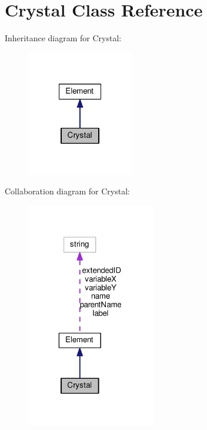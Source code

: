 \hypertarget{classCrystal}{\section{Crystal Class Reference}
\label{classCrystal}
}


Inheritance diagram for Crystal\+:
\nopagebreak
\begin{figure}[H]
\begin{center}
\leavevmode
\includegraphics[width=132pt]{classCrystal__inherit__graph}
\end{center}
\end{figure}


Collaboration diagram for Crystal\+:
\nopagebreak
\begin{figure}[H]
\begin{center}
\leavevmode
\includegraphics[width=160pt]{classCrystal__coll__graph}
\end{center}
\end{figure}
